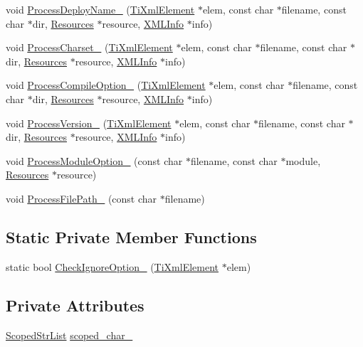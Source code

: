 \begin{DoxyCompactItemize}
\item 
void \hyperlink{classmocha_1_1_x_m_l_reader_a7c428adff5abba47fca8683f1013efef}{ProcessDeployName\_\-} (\hyperlink{class_ti_xml_element}{TiXmlElement} $\ast$elem, const char $\ast$filename, const char $\ast$dir, \hyperlink{classmocha_1_1_resources}{Resources} $\ast$resource, \hyperlink{classmocha_1_1_x_m_l_info}{XMLInfo} $\ast$info)
\item 
void \hyperlink{classmocha_1_1_x_m_l_reader_abffe9e24ba7103f6a20fbd377f06b38e}{ProcessCharset\_\-} (\hyperlink{class_ti_xml_element}{TiXmlElement} $\ast$elem, const char $\ast$filename, const char $\ast$dir, \hyperlink{classmocha_1_1_resources}{Resources} $\ast$resource, \hyperlink{classmocha_1_1_x_m_l_info}{XMLInfo} $\ast$info)
\item 
void \hyperlink{classmocha_1_1_x_m_l_reader_ac5f1e1f6398c30b089cf501fafdf3db4}{ProcessCompileOption\_\-} (\hyperlink{class_ti_xml_element}{TiXmlElement} $\ast$elem, const char $\ast$filename, const char $\ast$dir, \hyperlink{classmocha_1_1_resources}{Resources} $\ast$resource, \hyperlink{classmocha_1_1_x_m_l_info}{XMLInfo} $\ast$info)
\item 
void \hyperlink{classmocha_1_1_x_m_l_reader_adf5c6bf68f7831f1ad5d434c943ae33b}{ProcessVersion\_\-} (\hyperlink{class_ti_xml_element}{TiXmlElement} $\ast$elem, const char $\ast$filename, const char $\ast$dir, \hyperlink{classmocha_1_1_resources}{Resources} $\ast$resource, \hyperlink{classmocha_1_1_x_m_l_info}{XMLInfo} $\ast$info)
\item 
void \hyperlink{classmocha_1_1_x_m_l_reader_af5634427fa9a0d3c1a022f80a75fb146}{ProcessModuleOption\_\-} (const char $\ast$filename, const char $\ast$module, \hyperlink{classmocha_1_1_resources}{Resources} $\ast$resource)
\item 
void \hyperlink{classmocha_1_1_x_m_l_reader_abcfa4632fc6646238d72846a293b4ce1}{ProcessFilePath\_\-} (const char $\ast$filename)
\end{DoxyCompactItemize}
\subsection*{Static Private Member Functions}
\begin{DoxyCompactItemize}
\item 
static bool \hyperlink{classmocha_1_1_x_m_l_reader_a8be157beb9fa4944dd7e6bf48ce601fe}{CheckIgnoreOption\_\-} (\hyperlink{class_ti_xml_element}{TiXmlElement} $\ast$elem)
\end{DoxyCompactItemize}
\subsection*{Private Attributes}
\begin{DoxyCompactItemize}
\item 
\hyperlink{classmocha_1_1_scoped_array_list}{ScopedStrList} \hyperlink{classmocha_1_1_x_m_l_reader_a0d0d4ff33f378d6c61a18bf6e6a45b06}{scoped\_\-char\_\-}
\end{DoxyCompactItemize}
